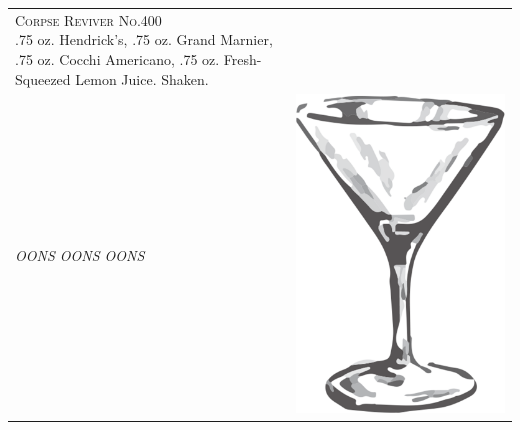 \documentclass{article}
\begin{document}
\begin{tabular}{*{2}{m{}}}
{\raggedleft\huge\textsc{Corpse Reviver No.400}\\*}
\raggedleft .75 oz. Hendrick's, .75 oz. Grand Marnier, .75 oz. Cocchi Americano, .75 oz. Fresh-Squeezed Lemon Juice. Shaken.\\
\raggedleft\small\textit{OONS OONS OONS}
&
\raggedright\includegraphics{goblet.png}\\
\end{tabular}
\end{document}
